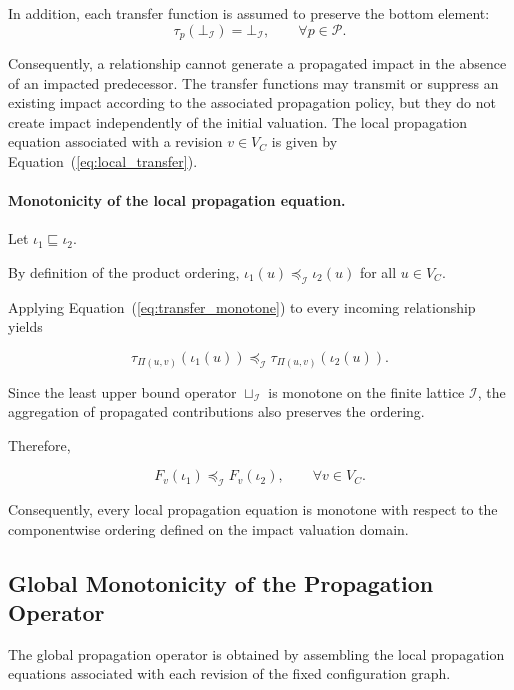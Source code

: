 \documentclass[10pt]{article}
\begin{document}
In addition, each transfer function is assumed to preserve the bottom element:
\begin{equation}
	\tau_p
	\left(
	\bot_{\mathcal I}
	\right)
	=
	\bot_{\mathcal I},
	\qquad
	\forall p\in\mathcal P.
	\label{eq:transfer_bottom_preservation}
\end{equation}

Consequently, a relationship cannot generate a propagated impact in the absence of an impacted predecessor. The transfer functions may transmit or suppress an existing impact according to the associated propagation policy, but they do not create impact independently of the initial valuation.
The local propagation equation associated with a revision $v\in V_C$ is
given by Equation~(\ref{eq:local_transfer}).

\paragraph{Monotonicity of the local propagation equation.}

Let $\iota_1\sqsubseteq\iota_2$.

By definition of the product ordering,
$\iota_1(u)\preceq_{\mathcal I}\iota_2(u)$ for all $u\in V_C$.

Applying Equation~(\ref{eq:transfer_monotone}) to every incoming relationship
yields

\begin{equation}
\label{eq:tau_pi_def1}
\tau_{\Pi(u,v)}
(
\iota_1(u)
)
\preceq_{\mathcal I}
\tau_{\Pi(u,v)}
(
\iota_2(u)
).
\end{equation}

Since the least upper bound operator $\sqcup_{\mathcal I}$
is monotone on the finite lattice $\mathcal I$, the aggregation of propagated contributions also preserves the ordering.

Therefore,

\begin{equation}
	\label{eq:local_monotone}
	F_v(\iota_1)
	\preceq_{\mathcal I}
	F_v(\iota_2),
	\qquad
	\forall v\in V_C.
\end{equation}

Consequently, every local propagation equation is monotone with respect to the componentwise ordering defined on the impact valuation domain.

\subsection{Global Monotonicity of the Propagation Operator}
\label{appendix:global_monotonicity}
The global propagation operator is obtained by assembling the local propagation equations associated with each revision of the fixed configuration graph.
\end{document}
